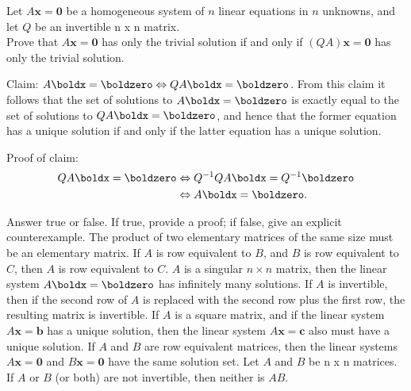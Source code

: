 \ii Let $A\textbf{x}=\textbf{0}$ be a homogeneous system of $n$ linear equations in $n$ unknowns, and let $Q$ be an invertible n x n matrix.\\
Prove that $A\textbf{x}=\textbf{0}$ has only the trivial solution if and only if $(QA)\textbf{x}=\textbf{0}$ has only the trivial solution.
\\
\begin{solution}
Claim: $A\boldx=\boldzero\Leftrightarrow QA\boldx=\boldzero$. From this claim it follows that the set of solutions to $A\boldx=\boldzero$ is exactly equal to the set of solutions to $QA\boldx=\boldzero$, and hence that the former equation has a unique solution if and only if the latter equation has a unique solution.

Proof of claim:
\begin{align*}
QA\boldx=\boldzero&\Leftrightarrow Q^{-1}QA\boldx=Q^{-1}\boldzero\\
&\Leftrightarrow A\boldx=\boldzero.
\end{align*}
\end{solution}
\ii Answer true or false. If true, provide a proof; if false, give an explicit counterexample.
\bb
\ii The product of two elementary matrices of the same size must be an elementary matrix.
\ii If $A$ is row equivalent to $B$, and $B$ is row equivalent to $C$, then $A$ is row equivalent to $C$.
\ii $A$ is a singular $n\times n$ matrix, then the linear system $A\boldx=\boldzero$ has infinitely many solutions.
\ii If $A$ is invertible, then if the second row of $A$ is replaced with the second row plus the first row, the resulting matrix is invertible.
\ii If $A$ is a square matrix, and if the linear system $A\textbf{x} = \textbf{b}$ has a unique solution, then the linear system $A\textbf{x} = \textbf{c}$ also must have a unique solution.
\ii If $A$ and $B$ are row equivalent matrices, then the linear systems $A\textbf{x}=\textbf{0}$ and $B\textbf{x}=\textbf{0}$ have the same solution set.
\ii Let $A$ and $B$ be n x n matrices. If $A$ or $B$ (or both) are not invertible, then neither is $AB$.
\ee
